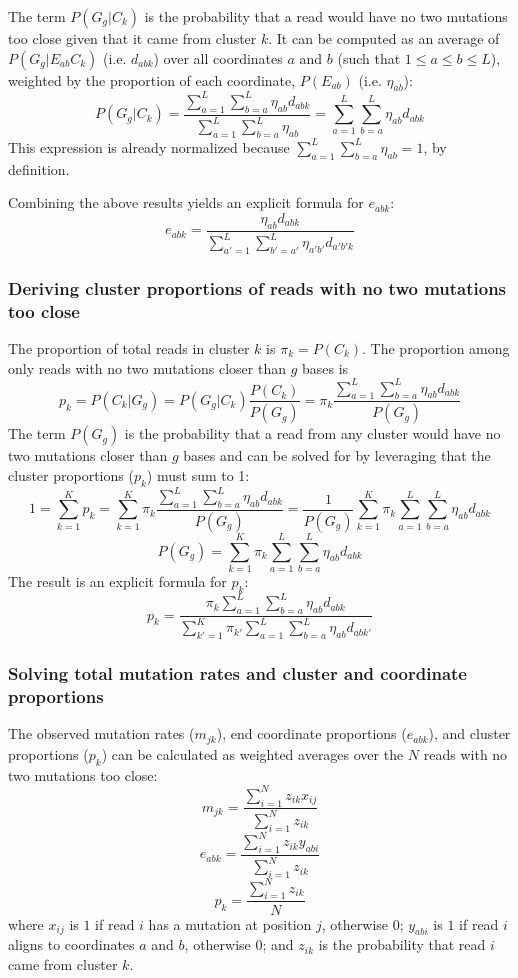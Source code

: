 \documentclass[../../MainTexts/main.tex]{subfiles}
\begin{document}
The term $P(G_g | C_k)$ is the probability that a read would have no two mutations too close given that it came from cluster $k$.
It can be computed as an average of $P(G_g | E_{ab} C_k)$ (i.e. $d_{abk}$) over all coordinates $a$ and $b$ (such that $1 \le a \le b \le L$), weighted by the proportion of each coordinate, $P(E_{ab})$ (i.e. $\eta_{ab}$):
$$P(G_g | C_k) = \frac{\sum_{a=1}^{L} \sum_{b=a}^{L} \eta_{ab} d_{abk}}{\sum_{a=1}^{L} \sum_{b=a}^{L} \eta_{ab}} = \sum_{a=1}^{L} \sum_{b=a}^{L} \eta_{ab} d_{abk}$$
This expression is already normalized because $\sum_{a=1}^{L} \sum_{b=a}^{L} \eta_{ab} = 1$, by definition.

Combining the above results yields an explicit formula for $e_{abk}$:
$$e_{abk} = \frac{\eta_{ab} d_{abk}}{\sum_{a'=1}^{L} \sum_{b'=a'}^{L} \eta_{a'b'} d_{a'b'k}}$$

\subsubsection{Deriving cluster proportions of reads with no two mutations too close}
\label{calc_p_clust_noclose}

The proportion of total reads in cluster $k$ is $\pi_k = P(C_k)$.
The proportion among only reads with no two mutations closer than $g$ bases is
$$p_k = P(C_k | G_g) = P(G_g | C_k) \frac{P(C_k)}{P(G_g)} = \pi_k \frac{\sum_{a=1}^{L} \sum_{b=a}^{L} \eta_{ab} d_{abk}}{P(G_g)}$$
The term $P(G_g)$ is the probability that a read from any cluster would have no two mutations closer than $g$ bases and can be solved for by leveraging that the cluster proportions ($p_k$) must sum to 1:
$$1 = \sum_{k=1}^{K} p_k = \sum_{k=1}^{K} \pi_k \frac{\sum_{a=1}^{L} \sum_{b=a}^{L} \eta_{ab} d_{abk}}{P(G_g)} = \frac{1}{{P(G_g)}} \sum_{k=1}^{K} \pi_k \sum_{a=1}^{L} \sum_{b=a}^{L} \eta_{ab} d_{abk}$$
$$P(G_g) = \sum_{k=1}^{K} \pi_k \sum_{a=1}^{L} \sum_{b=a}^{L} \eta_{ab} d_{abk}$$
The result is an explicit formula for $p_k$:
$$p_k = \frac{\pi_k \sum_{a=1}^{L} \sum_{b=a}^{L} \eta_{ab} d_{abk}}{\sum_{k'=1}^{K} \pi_{k'} \sum_{a=1}^{L} \sum_{b=a}^{L} \eta_{ab} d_{abk'}}$$

\subsubsection{Solving total mutation rates and cluster and coordinate proportions}
\label{calc_params}

The observed mutation rates ($m_{jk}$), end coordinate proportions ($e_{abk}$), and cluster proportions ($p_k$) can be calculated as weighted averages over the $N$ reads with no two mutations too close:
$$m_{jk} = \frac{\sum_{i=1}^{N} z_{ik} x_{ij}}{\sum_{i=1}^{N} z_{ik}}$$
$$e_{abk} = \frac{\sum_{i=1}^{N} z_{ik} y_{abi}}{\sum_{i=1}^{N} z_{ik}}$$
$$p_k = \frac{\sum_{i=1}^{N} z_{ik}}{N}$$
where $x_{ij}$ is $1$ if read $i$ has a mutation at position $j$, otherwise $0$; $y_{abi}$ is $1$ if read $i$ aligns to coordinates $a$ and $b$, otherwise $0$; and $z_{ik}$ is the probability that read $i$ came from cluster $k$.
\end{document}
